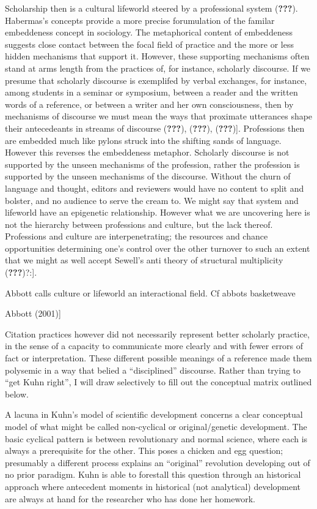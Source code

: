 Scholarship then is a cultural lifeworld steered by a professional
system ({\textbf{???}}). Habermas's concepts provide a more precise
forumulation of the familar embeddeness concept in sociology. The
metaphorical content of embeddeness suggests close contact between the
focal field of practice and the more or less hidden mechanisms that
support it. However, these supporting mechanisms often stand at arms
length from the practices of, for instance, scholarly discourse. If we
presume that scholarly discourse is exemplifed by verbal exchanges, for
instance, among students in a seminar or symposium, between a reader and
the written words of a reference, or between a writer and her own
consciousness, then by mechanisms of discourse we must mean the ways
that proximate utterances shape their antecedeants in streams of
discourse ({\textbf{???}}), ({\textbf{???}}), ({\textbf{???}}){]}.
Professions then are embedded much like pylons struck into the shifting
sands of language. However this reverses the embeddeness metaphor.
Scholarly discourse is not supported by the unseen mechanisms of the
profession, rather the profession is supported by the unseen mechanisms
of the discourse. Without the churn of language and thought, editors and
reviewers would have no content to split and bolster, and no audience to
serve the cream to. We might say that system and lifeworld have an
epigenetic relationship. However what we are uncovering here is not the
hierarchy between professions and culture, but the lack thereof.
Professions and culture are interpenetrating; the resources and chance
opportunities determining one's control over the other turnover to such
an extent that we might as well accept Sewell's anti theory of
structural multiplicity ({\textbf{???}})?:{]}.

Abbott calls culture or lifeworld an interactional field. Cf abbots
basketweave

Abbott (2001){]}

Citation practices however did not necessarily represent better
scholarly practice, in the sense of a capacity to communicate more
clearly and with fewer errors of fact or interpretation. These different
possible meanings of a reference made them polysemic in a way that
belied a ``disciplined'' discourse. Rather than trying to ``get Kuhn
right'', I will draw selectively to fill out the conceptual matrix
outlined below.

A lacuna in Kuhn's model of scientific development concerns a clear
conceptual model of what might be called non-cyclical or
original/genetic development. The basic cyclical pattern is between
revolutionary and normal science, where each is always a prerequisite
for the other. This poses a chicken and egg question; presumably a
different process explains an ``original'' revolution developing out of
no prior paradigm. Kuhn is able to forestall this question through an
historical approach where antecedent moments in historical (not
analytical) development are always at hand for the researcher who has
done her homework.

